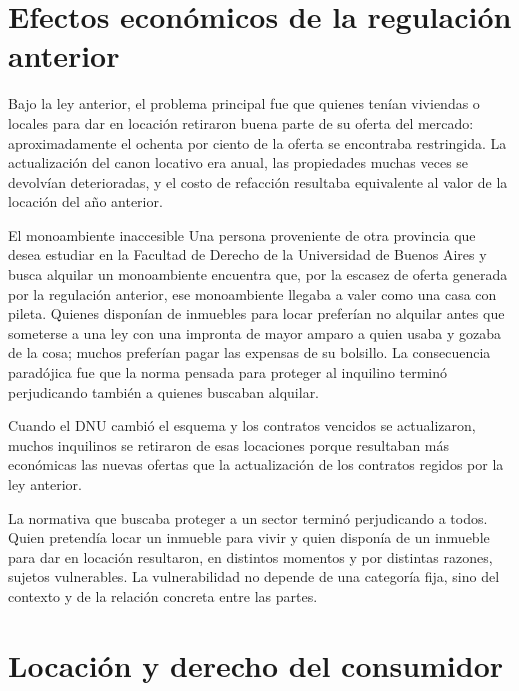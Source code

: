 \documentclass[12pt,oneside]{book}
\begin{document}
\section{Efectos económicos de la regulación anterior}\label{sec:efectos-economicos}

Bajo la ley anterior, el problema principal fue que quienes tenían viviendas o locales para dar en locación retiraron buena parte de su oferta del mercado: aproximadamente el ochenta por ciento de la oferta se encontraba restringida. La actualización del canon locativo era anual, las propiedades muchas veces se devolvían deterioradas, y el costo de refacción resultaba equivalente al valor de la locación del año anterior.

\begin{example}{El monoambiente inaccesible}
Una persona proveniente de otra provincia que desea estudiar en la Facultad de Derecho de la Universidad de Buenos Aires y busca alquilar un monoambiente encuentra que, por la escasez de oferta generada por la regulación anterior, ese monoambiente llegaba a valer como una casa con pileta. Quienes disponían de inmuebles para locar preferían no alquilar antes que someterse a una ley con una impronta de mayor amparo a quien usaba y gozaba de la cosa; muchos preferían pagar las expensas de su bolsillo. La consecuencia paradójica fue que la norma pensada para proteger al inquilino terminó perjudicando también a quienes buscaban alquilar.
\end{example}

Cuando el DNU cambió el esquema y los contratos vencidos se actualizaron, muchos inquilinos se retiraron de esas locaciones porque resultaban más económicas las nuevas ofertas que la actualización de los contratos regidos por la ley anterior.

\begin{important}
La normativa que buscaba proteger a un sector terminó perjudicando a todos. Quien pretendía locar un inmueble para vivir y quien disponía de un inmueble para dar en locación resultaron, en distintos momentos y por distintas razones, sujetos vulnerables. La vulnerabilidad no depende de una categoría fija, sino del contexto y de la relación concreta entre las partes.
\end{important}

\section{Locación y derecho del consumidor}
\end{document}
